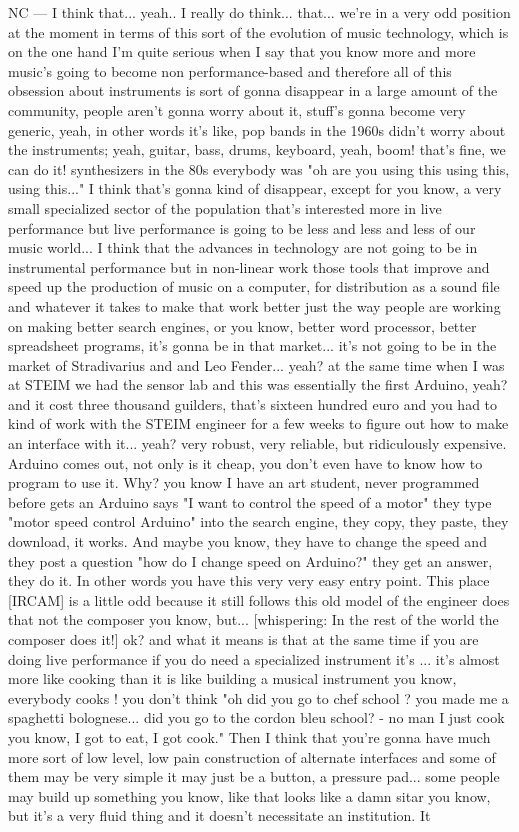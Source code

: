 NC — I think that... yeah..  I really do think... that... we're in a very odd position at the moment in terms of this sort of the evolution of music technology, which is on the one hand I'm quite serious when I say that you know more and more music's going to become non performance-based and therefore all of this obsession about instruments is sort of gonna disappear in a large amount of the community, people aren't gonna worry about it, stuff's gonna become very generic, yeah, in other words it's like, pop bands in the 1960s didn't worry about the instruments; yeah, guitar, bass, drums, keyboard, yeah, boom! that's fine, we can do it! synthesizers in the 80s everybody was "oh are you using this using this, using this..." I think that's gonna kind of disappear, except for you know, a very small specialized sector of the population that's interested more in live performance but live performance is going to be less and less and less of our music world... I think that the advances in technology are not going to be in instrumental performance but in non-linear work those tools that improve and speed up the production of music on a computer, for distribution as a sound file and whatever it takes to make that work better just the way people are working on making better search engines, or you know, better word processor, better spreadsheet programs, it's gonna be in that market... it's not going to be in the market of Stradivarius and and Leo Fender... yeah? at the same time when I was at STEIM we had the sensor lab and this was essentially the first Arduino, yeah? and it cost three thousand guilders, that's sixteen hundred euro and you had to kind of work with the STEIM engineer for a few weeks to figure out how to make an interface with it... yeah? very robust, very reliable, but ridiculously expensive. Arduino comes out, not only is it cheap, you don't even have to know how to program to use it. Why? you know I have an art student,  never programmed before gets an Arduino says "I want to control the speed of a motor" they type "motor speed control Arduino" into the search engine, they copy, they paste, they download, it works. And maybe you know, they have to change the speed and they post a question "how do I change speed on Arduino?" they get an answer, they do it. In other words you have this very very easy entry point. This place [IRCAM] is a little odd because it still follows this old model of the engineer does that not the composer you know, but... [whispering: In the rest of the world the composer does it!] ok? and what it means is that at the same time if you are doing live performance if you do need a specialized instrument it's ... it's almost more like cooking than it is like building a musical instrument you know, everybody cooks ! you don't think "oh did you go to chef school ? you made me a spaghetti bolognese... did you go to the cordon bleu school? - no man I just cook you know, I got to eat, I got cook."  Then I think that you're gonna have much more sort of low level,  low pain construction of alternate interfaces and some of them may be  very simple it may just be a button, a pressure pad... some people  may build up something you know, like that looks like a damn sitar you know, but it's a very fluid thing and it doesn't necessitate an institution. It 